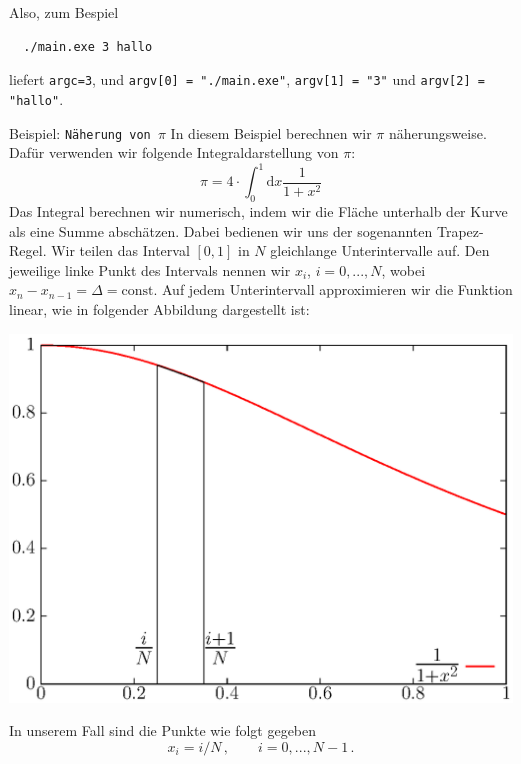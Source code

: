 Also, zum Bespiel
\begin{verbatim}
  ./main.exe 3 hallo
\end{verbatim}
liefert \verb|argc=3|, und \verb|argv[0] = "./main.exe"|, \verb|argv[1] = "3"| und \verb|argv[2] = "hallo"|.
\newpage
\begin{myexampleprogram}{Beispiel: \texttt{Näherung von $\pi$}}
  In diesem Beispiel berechnen wir $\pi$ näherungsweise.
  Dafür verwenden wir folgende Integraldarstellung von $\pi$:
  \begin{equation}
    \pi=4\cdot \int_{0}^{1} \mathrm{d}x \dfrac{1}{1+x^2}
  \end{equation}
  Das Integral berechnen wir numerisch, indem wir die Fläche unterhalb der Kurve als eine Summe abschätzen.
  Dabei bedienen wir uns der sogenannten Trapez-Regel.
  Wir teilen das Interval $[0,1]$ in $N$ gleichlange Unterintervalle auf.
  Den jeweilige linke Punkt des Intervals nennen wir $x_i$, $i=0,...,N$, wobei $x_n-x_{n-1}=\Delta=\mathrm{const}$.
  Auf jedem Unterintervall approximieren wir die Funktion linear, wie in folgender Abbildung dargestellt ist:
  \vspace{-5cm}
  \begin{center}
    \includegraphics[width=.8\linewidth]{trapez1.ps}
  \end{center}
  \vspace{-6cm}
  In unserem Fall sind die Punkte wie folgt gegeben
  \begin{displaymath}
    x_i = i/N\,,\qquad i = 0, ..., N-1\,.
  \end{displaymath}



\end{myexampleprogram}
